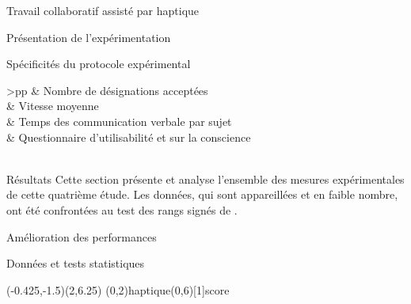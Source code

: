 \documentclass[myfrancais,ngerman,english,frenchb]{mythesis}
\begin{document}
\begin{mychapter}{Travail collaboratif assisté par haptique}
\begin{mysection}{Présentation de l'expérimentation}
\begin{mysubsection}{Spécificités du protocole expérimental}
\begin{mytable}
\begin{mytabular}{>{\bfseries}p{\expfourfirstcolumn}p{\expfoursecondcolumn}}
						                                           &  Nombre de désignations acceptées                        \\
						                                           &  Vitesse moyenne                                         \\
						                                           &  Temps des communication verbale par sujet               \\
						                                           &  Questionnaire d'utilisabilité et sur la conscience     \\
						\mymiddlerule[\heavyrulewidth]
						 \\
						\mybottomrule
					\end{mytabular}
				\end{mytable}
			\end{mysubsection}
		\end{mysection}
		\begin{mysection}{Résultats}
			Cette section présente et analyse l'ensemble des mesures expérimentales de cette quatrième étude.
			Les données, qui sont appareillées et en faible nombre, ont été confrontées au test des rangs signés de .
			\begin{mysubsection}{Amélioration des performances}
				\begin{mysubsubsection}{Données et tests statistiques}
					\begin{myfigure}
						\begin{myps}(-0.425,-1.5)(2,6.25)
							\myaxes(0,2){haptique}(0,6)[1]{score }

\end{myps}
\end{myfigure}
\end{mysubsubsection}
\end{mysubsection}
\end{mysection}
\end{mychapter}
\end{document}
